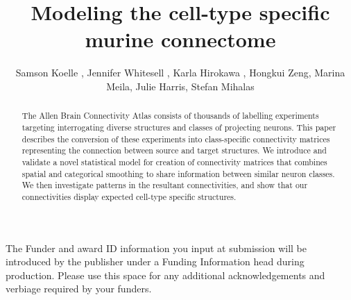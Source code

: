 \documentclass[NETN,manuscript]{stjour-new}
\begin{document}



\title{Modeling the cell-type specific murine connectome}

\author[Koelle et al]%
{Samson Koelle , Jennifer Whitesell , Karla Hirokawa ,  Hongkui Zeng, Marina Meila, Julie Harris, Stefan Mihalas}





\begin{abstract}

The Allen Brain Connectivity Atlas consists of thousands of labelling experiments targeting interrogating diverse structures and classes of projecting neurons.
This paper describes the conversion of these experiments into class-specific connectivity matrices representing the connection between source and target structures.
We introduce and validate a novel statistical model for creation of connectivity matrices that combines spatial and categorical smoothing to share information between similar neuron classes.
We then investigate patterns in the resultant connectivities, and show that our connectivities display expected cell-type specific structures.

\end{abstract}

\begin{authorsummary}
\end{authorsummary}







\acknowledgments
The Funder and award ID information you input at submission will be introduced by the publisher under a Funding Information head during production. 
Please use this space for any additional acknowledgements and verbiage required by your funders.
\end{document}
